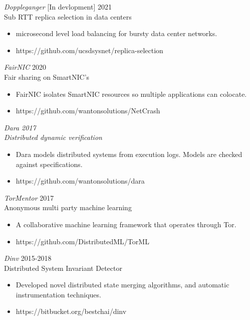 \documentclass[line,margin]{res}
\begin{document}
\begin{resume}
{\sl Doppleganger} [In devlopment] \hfill 2021\\
    Sub RTT replica selection in data centers
\begin{itemize} \itemsep -2pt
        \item microsecond level load balancing for bursty data center networks.
        \item https://github.com/ucsdsysnet/replica-selection
\end{itemize}

{\sl FairNIC } \hfill 2020\\
    Fair sharing on SmartNIC's
\begin{itemize} \itemsep -2pt
        \item FairNIC isolates SmartNIC resources so multiple applications can colocate.
        \item https://github.com/wantonsolutions/NetCrash
\end{itemize}

{\sl Dara \hfill 2017\\
    Distributed dynamic verification
\begin{itemize} \itemsep -2pt
        \item Dara models distributed systems from execution logs. Models are checked against specifications.
        \item https://github.com/wantonsolutions/dara
\end{itemize}

{\sl TorMentor} \hfill 2017\\
    Anonymous multi party machine learning
\begin{itemize} \itemsep -2pt
        \item A collaborative machine learning framework that operates through Tor.
        \item https://github.com/DistributedML/TorML
\end{itemize}


{\sl Dinv} \hfill 2015-2018\\
    Distributed System Invariant Detector
\begin{itemize} \itemsep -2pt
        \item Developed novel distributed state merging algorithms, and automatic instrumentation techniques.
        \item https://bitbucket.org/bestchai/dinv
\end{itemize}


}
\end{resume}
\end{document}
